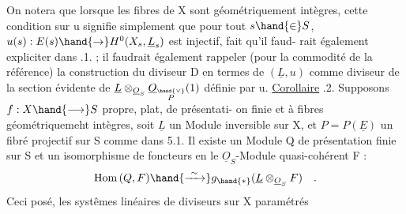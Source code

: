 On notera que lorsque les fibres de X sont 
géométriquement intègres, cette condition sur u signifie simplement que
pour tout $s\hand{\in} S$, $u(s): E(s)\hand{\rightarrow} H^{0}(X_s,\underline{L}_s)$ est injectif, fait qu'il faud-%
rait également expliciter dans .1. ;  il faudrait également rappeler
(pour la commodité de la référence) la construction du diviseur D en
termes de $(\underline{L},u)$ comme diviseur de la section évidente  de $\underline{L}\otimes_{\underline{O}_S}\underline{O}_{\overset{\hand{\vee}}{P}}(1)$
définie par u.
\uline{Corollaire} .2.  Supposons $f: X\hand{\longrightarrow} S$ propre, plat, de présentati-%
on finie et à fibres géométriquemeht intègres,  soit $\underline{L}$ un Module
inversible sur X, et $P=P(\underline{E})$ un fibré projectif sur S comme dans 5.1.
 Il existe un Module Q de présentation finie sur S et un
isomorphisme de foncteurs en le $\underline{O}_S$-Module quasi-cohérent F :
\[ \mathrm{Hom}\,(Q,F) \hand{\xrightarrow{\ \sim\ }} g_{\hand{*}}(\underline{L}\otimes_{\underline{O}_S}F) \quad . \]
Ceci posé, les  systêmes linéaires de diviseurs sur X paramétrés

